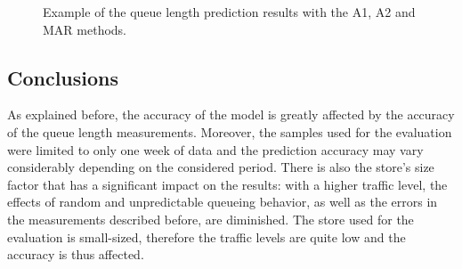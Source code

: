 \begin{figure}
  \begin{center}
  \end{center}
  \caption{Example of the queue length prediction results with the A1, A2 and MAR methods.}
  \label{fig:queue_length_forecast}
\end{figure}

\subsection{Conclusions}
\label{subsec:queue_length_forecast_results_conclusions}

As explained before, the accuracy of the model is greatly affected by the accuracy of the queue length measurements. Moreover, the samples used for the evaluation were limited to only one week of data and the prediction accuracy may vary considerably depending on the considered period. There is also the store’s size factor that has a significant impact on the results: with a higher traffic level, the effects of random and unpredictable queueing behavior, as well as the errors in the measurements described before, are diminished. The store used for the evaluation is small-sized, therefore the traffic levels are quite low and the accuracy is thus affected.

\clearpage